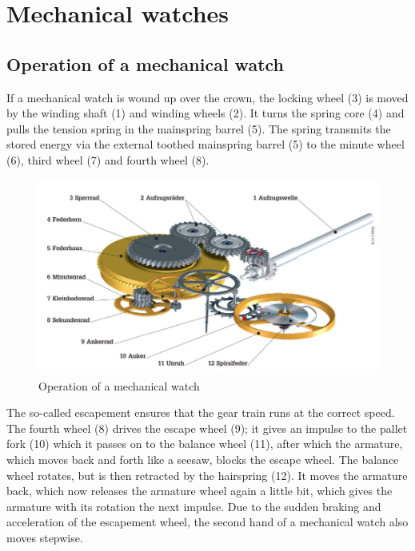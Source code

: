 \documentclass[12pt, a4paper]{report}
\begin{document}
    
    \section{Mechanical watches}  
    \subsection{Operation of a mechanical watch}  
    If a mechanical watch is wound up over the crown, the locking wheel (3) is moved by the winding shaft (1) and winding wheels (2). It turns the spring core (4) and pulls the tension spring in the mainspring barrel (5). The spring transmits the stored energy via the external toothed mainspring barrel (5) to the minute wheel (6), third wheel (7) and fourth wheel (8). 
    \newline
    \noindent
    \begin{figure}[H]
    \centering
    \includegraphics[scale=0.4]{Images/Funktionsweise-Uhrwerk.jpg}
    
    \caption{Operation of a mechanical watch \cite{Uhrwerk}}
    \end{figure}
The so-called escapement ensures that the gear train runs at the correct speed. The fourth wheel (8) drives the escape wheel (9); it gives an impulse to the pallet fork (10) which it passes on to the balance wheel (11), after which the armature, which moves back and forth like a seesaw, blocks the escape wheel. The balance wheel rotates, but is then retracted by the hairspring (12). It moves the armature back, which now releases the armature wheel again a little bit, which gives the armature with its rotation the next impulse. Due to the sudden braking and acceleration of the escapement wheel, the second hand of a mechanical watch also moves stepwise. \cite{Uhrwerk}
    \newline
\end{document}
